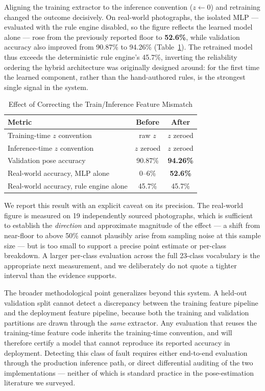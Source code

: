 \documentclass[conference]{IEEEtran}
\begin{document}
Aligning the training extractor to the inference convention ($z \leftarrow 0$)
and retraining changed the outcome decisively. On real-world photographs, the
isolated MLP --- evaluated with the rule engine disabled, so the figure
reflects the learned model alone --- rose from the previously reported floor to
\textbf{52.6\%}, while validation accuracy also improved from 90.87\% to
94.26\% (Table~\ref{tab:zerozfix}). The retrained model thus exceeds the
deterministic rule engine's 45.7\%, inverting the reliability ordering the
hybrid architecture was originally designed around: for the first time the
learned component, rather than the hand-authored rules, is the strongest
single signal in the system.

\begin{table}[!t]
\centering
\caption{Effect of Correcting the Train/Inference Feature Mismatch}
\label{tab:zerozfix}
\begin{tabular}{@{}lcc@{}}
\toprule
\textbf{Metric} & \textbf{Before} & \textbf{After} \\
\midrule
Training-time $z$ convention & raw $z$ & $z$ zeroed \\
Inference-time $z$ convention & $z$ zeroed & $z$ zeroed \\
\midrule
Validation pose accuracy & 90.87\% & \textbf{94.26\%} \\
Real-world accuracy, MLP alone & 0--6\% & \textbf{52.6\%} \\
Real-world accuracy, rule engine alone & 45.7\% & 45.7\% \\
\bottomrule
\end{tabular}
\end{table}

We report this result with an explicit caveat on its precision. The real-world
figure is measured on 19 independently sourced photographs, which is sufficient
to establish the \emph{direction} and approximate magnitude of the effect --- a
shift from near-floor to above 50\% cannot plausibly arise from sampling noise
at this sample size --- but is too small to support a precise point estimate or
per-class breakdown. A larger per-class evaluation across the full 23-class
vocabulary is the appropriate next measurement, and we deliberately do not
quote a tighter interval than the evidence supports.

The broader methodological point generalizes beyond this system. A held-out
validation split cannot detect a discrepancy between the training feature
pipeline and the deployment feature pipeline, because both the training and
validation partitions are drawn through the \emph{same} extractor. Any
evaluation that reuses the training-time feature code inherits the training-time
convention, and will therefore certify a model that cannot reproduce its
reported accuracy in deployment. Detecting this class of fault requires either
end-to-end evaluation through the production inference path, or direct
differential auditing of the two implementations --- neither of which is
standard practice in the pose-estimation literature we surveyed.
\end{document}
